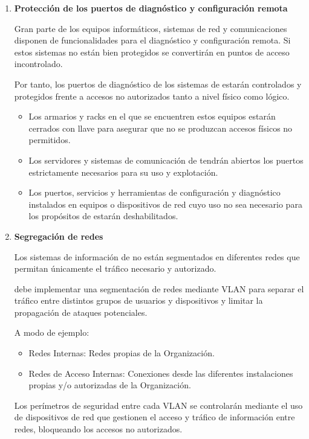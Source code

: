 \begin{enumerate}[label=\alph*)]
    \item \textbf{Protección de los puertos de diagnóstico y configuración remota}

    Gran parte de los equipos informáticos, sistemas de red y comunicaciones disponen de funcionalidades para el diagnóstico y configuración remota. Si estos sistemas no están bien protegidos se convertirán en puntos de acceso incontrolado.

    Por tanto, los puertos de diagnóstico de los sistemas de \Beneficiario{} estarán controlados y protegidos frente a accesos no autorizados tanto a nivel físico como lógico.

    \begin{itemize}
        \item Los armarios y racks en el que se encuentren estos equipos estarán cerrados con llave para asegurar que no se produzcan accesos físicos no permitidos.
        \item Los servidores y sistemas de comunicación de \Beneficiario{} tendrán abiertos los puertos estrictamente necesarios para su uso y explotación.
        \item Los puertos, servicios y herramientas de configuración y diagnóstico instalados en equipos o dispositivos de red cuyo uso no sea necesario para los propósitos de \Beneficiario{} estarán deshabilitados.
    \end{itemize}

    \item \textbf{Segregación de redes}

    Los sistemas de información de \Beneficiario{} no están segmentados en diferentes redes que permitan únicamente el tráfico necesario y autorizado.

    \Beneficiario{} debe implementar una segmentación de redes mediante VLAN para separar el tráfico entre distintos grupos de usuarios y dispositivos y limitar la propagación de ataques potenciales.

    A modo de ejemplo:
    \begin{itemize}
        \item Redes Internas: Redes propias de la Organización.
        \item Redes de Acceso Internas: Conexiones desde las diferentes instalaciones propias y/o autorizadas de la Organización.
    \end{itemize}

    Los perímetros de seguridad entre cada VLAN se controlarán mediante el uso de dispositivos de red que gestionen el acceso y tráfico de información entre redes, bloqueando los accesos no autorizados.


\end{enumerate}
